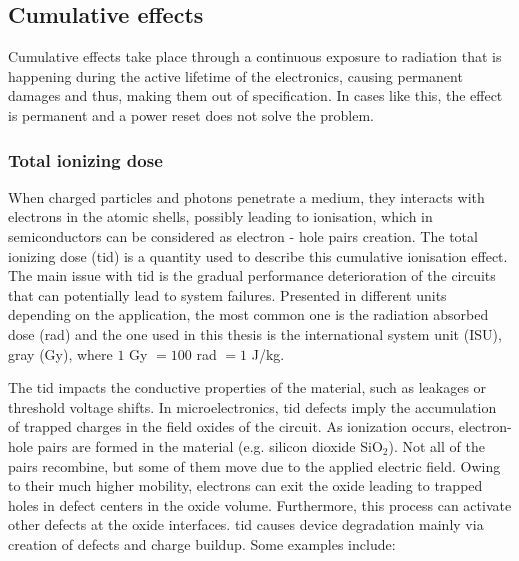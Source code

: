 \documentclass[encoding=utf8,british]{tumphthesis}
\begin{document}
\subsection{Cumulative effects}
Cumulative effects take place through a continuous exposure to radiation that is happening during the active lifetime of the electronics, causing permanent damages and thus, making them out of specification. In cases like this, the effect is permanent and a power reset does not solve the problem. 


\subsubsection{Total ionizing dose}
\label{subsubsection:tid}

When charged particles and photons penetrate a medium, they interacts with electrons in the atomic shells, possibly leading to ionisation, which in semiconductors can be considered as electron - hole pairs creation. The total ionizing dose (\acrshort{tid}) is a quantity used to describe this cumulative ionisation effect. The main issue with \acrshort{tid} is the gradual performance deterioration of the circuits that can potentially lead to system failures. Presented in different units depending on the application, the most common one is the radiation absorbed dose (\acrshort{rad}) and the one used in this thesis is the international system unit (ISU), gray (Gy), where $1$ Gy $= 100$ rad $= 1$ J/kg. 

The \acrshort{tid} impacts the conductive properties of the material, such as leakages or threshold voltage shifts. 
In microelectronics, \acrshort{tid} defects imply the accumulation of trapped charges in the field oxides of the circuit. As ionization occurs, electron-hole pairs are formed in the material (e.g. silicon dioxide SiO$_2$). Not all of the pairs recombine, but some of them move due to the applied electric field. Owing to their much higher mobility, electrons can exit the oxide leading to trapped holes in defect centers in the oxide volume. Furthermore, this process can activate other defects at the oxide interfaces. \acrshort{tid} causes device degradation mainly via creation of defects and charge buildup. Some examples include:
\end{document}
